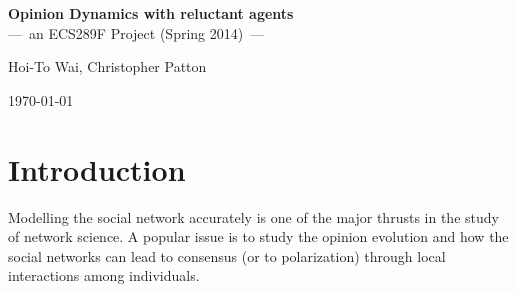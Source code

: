 \documentclass[letter]{article}
\theoremstyle{remark}
\begin{document}
\setcounter{page}{1}
\linespread{1.1}
\normalsize

\setlength{\parskip}{.2cm}

\begin{center} {\Large \textbf{
Opinion Dynamics with  reluctant agents} \vspace{.3cm} \\
{\normalsize ---~an ECS289F Project (Spring 2014)~---}} \vspace{.3cm}

{Hoi-To Wai, Christopher Patton}

\today

\end{center}
\vspace{0.1cm}


\begin{abstract}
The study of opinion dynamics attempts to model and predict the evolution of opinions in social networks. Pioneered by DeGroot and many others, previous works have studied scenarios where the opinion updates are non-linear, when the agents are heterogenous, etc. 
We propose a variation of the DeGroot model which attempts to capture \emph{reluctance} in agent behavior. Specifically, we study the affects of reluctant agents on opinion dynamics using mathematical analysis and numerical simulations. We show that the opinions of agents converge to a consensus asymptotically. However, it is observed that such consensus value will no longer be the original average opinion held by the agents in the network. Instead, the consensus value on average will be biased towards the initial opinion held by these reluctant agents. This suggests that the social network may fail to attain the `wisdom of the crowd'. 
Finally, we present several extensions to the described model. 
\end{abstract}



\section{Introduction} \vspace{-.3cm}

Modelling the social network accurately is one of the major thrusts in the study of network science. A popular issue is to study the opinion evolution and how the social networks can lead to consensus (or to polarization) through local interactions among individuals. 
\end{document}
